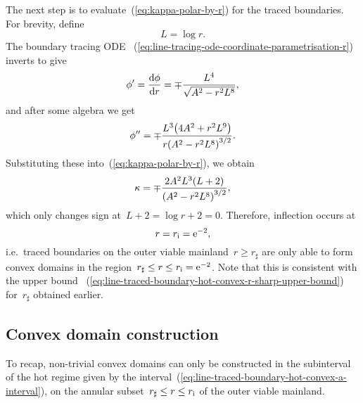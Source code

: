 The next step is to evaluate~(\ref{eq:kappa-polar-by-r})
for the traced boundaries.
For brevity, define
\begin{equation}
  L = \log r.
  \label{eq:line-abbreviation-l}
\end{equation}
The boundary tracing ODE~%
  (\ref{eq:line-tracing-ode-coordinate-parametrisation-r})
inverts to give
\begin{equation}
  \phi' = \tder{\phi}{r} = \mp \frac{L^4}{\sqrt{A^2 - r^2 L^8}},
  \label{eq:line-traced-boundary-phi-r-derivative}
\end{equation}
and after some algebra we get
\begin{equation}
  \phi'' =
  \mp \frac{L^3 \roundbr*{4 A^2 + r^2 L^9}}{r \roundbr*{A^2 - r^2 L^8}^{3/2}}.
  \label{eq:line-traced-boundary-phi-r-second-derivative}
\end{equation}
Substituting these into~(\ref{eq:kappa-polar-by-r}),
we obtain
\begin{equation}
  \kappa =
  \mp \frac{2 A^2 L^3 (L + 2)}{\roundbr*{A^2 - r^2 L^8}^{3/2}},
  \label{eq:line-traced-boundary-kappa-polar-by-r}
\end{equation}
which only changes sign at~$L + 2 = \log r + 2 = 0$.
Therefore, inflection occurs at
\begin{equation}
  r = r_\infl = \ee^{-2},
  \label{eq:line-r-inflection}
\end{equation}
i.e.~traced boundaries on the outer viable mainland~$r \ge r_\sharp$
are only able to form convex domains
in the region~$r_\sharp \le r \le r_{\mathrm{i}} = \mathrm{e}^{-2}$.
Note that this is consistent with the upper bound~%
  (\ref{eq:line-traced-boundary-hot-convex-r-sharp-upper-bound})
for~$r_\sharp$ obtained earlier.

\subsection{Convex domain construction}
\label{sec:polar.convex.construction}

To recap, non-trivial convex domains can only be constructed
in the subinterval of the hot regime
given by the interval~(\ref{eq:line-traced-boundary-hot-convex-a-interval}),
on the annular subset~$r_\sharp \le r \le r_{\mathrm{i}}$
of the outer viable mainland.

\begin{figure}
\end{figure}

